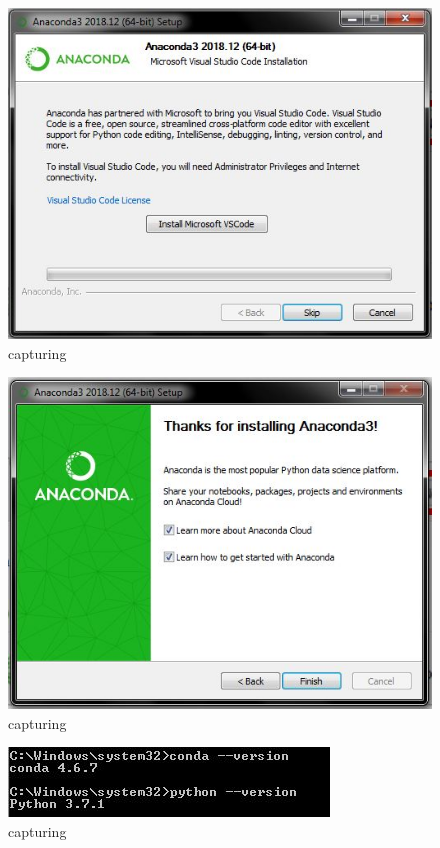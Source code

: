\begin{enumerate}
\begin{itemize}
\begin{figure}[ht]
\centering
\includegraphics[scale=0.5]{figures/8.jpg}
\caption{capturing}
\label{proses instalasi}
\end{figure}

\begin{figure}[ht]
\centering
\includegraphics[scale=0.5]{figures/9.jpg}
\caption{capturing}
\label{proses instalasi}
\end{figure}

\begin{figure}[ht]
\centering
\includegraphics[scale=0.5]{figures/10.jpg}
\caption{capturing}
\label{proses instalasi}
\end{figure}


\end{itemize}
\end{enumerate}
